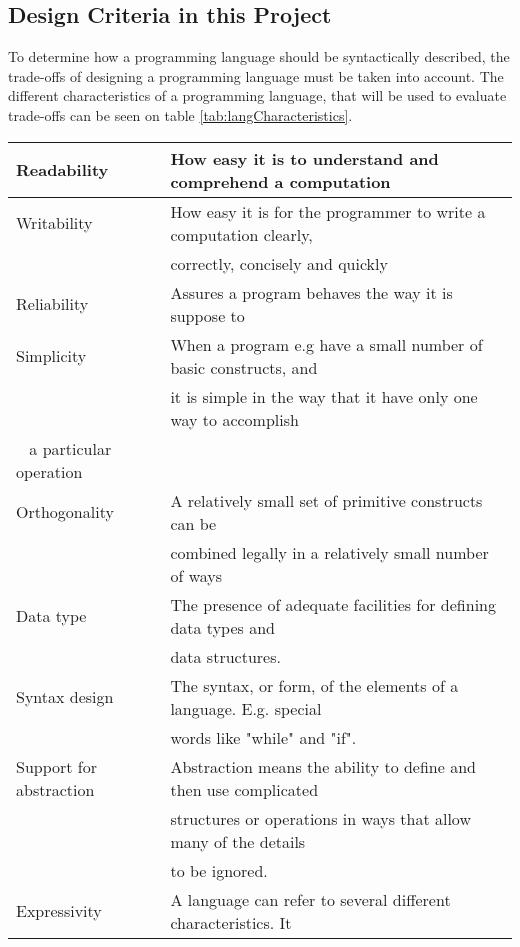 \subsection{Design Criteria in this Project}
To determine how a programming language should be syntactically described, the trade-offs of designing a programming language must be taken into account. The different characteristics of a programming language, that will be used to evaluate trade-offs can be seen on table \ref{tab:langCharacteristics}.
\begin{table}[H]
	\begin{tabular}{|l|l|}
		\hline
		
		Readability				& How easy it is to understand and comprehend a computation 		\\ \hline
		Writability				& How easy it is for the programmer to write a computation clearly, \\
		~ 						& correctly, concisely and quickly 									\\ \hline
		Reliability 			& Assures a program behaves the way it is suppose to				\\ \hline
		Simplicity				& When a program e.g have a small number of basic constructs, and 	\\
		~						& it is simple in the way that it have only one way to accomplish	\\
		~						a particular operation												\\ \hline
		Orthogonality 			& A relatively small set of primitive constructs can be				\\
		~ 						& combined legally in a relatively small number of ways				\\ \hline	
		Data type				& The presence of adequate facilities for defining data types and 	\\
		~						& data structures.													\\ \hline
		Syntax design			& The syntax, or form, of the elements of a language. E.g. special	\\
		~						& words like "while" and "if".										\\ \hline
		Support for abstraction	& Abstraction means the ability to define and then use complicated	\\
		~						& structures or operations in ways that allow many of the details	\\
		~						& to be ignored.													\\ \hline
		Expressivity			& A language can refer to several different characteristics. It		\\

\end{tabular}
\end{table}
